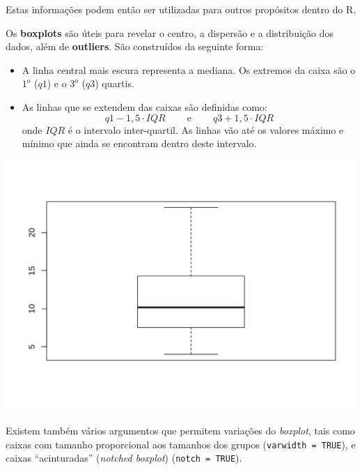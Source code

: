 \documentclass[10pt,a4paper]{book}
\newenvironment{Shaded}{\begin{snugshade}}{\end{snugshade}}
\newcommand{\KeywordTok}[1]{\textcolor[rgb]{0.13,0.29,0.53}{\textbf{#1}}}
\newcommand{\OperatorTok}[1]{\textcolor[rgb]{0.81,0.36,0.00}{\textbf{#1}}}
\newcommand{\NormalTok}[1]{#1}
\providecommand{\tightlist}{%
  \setlength{\itemsep}{0pt}\setlength{\parskip}{0pt}}
\begin{document}
Estas informações podem então ser utilizadas para outros propósitos
dentro do R.

Os \textbf{boxplots} são úteis para revelar o centro, a dispersão e a
distribuição dos dados, além de \textbf{outliers}. São construídos da
seguinte forma:

\begin{itemize}
\tightlist
\item
  A linha central mais escura representa a mediana. Os extremos da caixa
  são o \(1^{o}\) (\(q1\)) e o \(3^{o}\) (\(q3\)) quartis.
\item
  As linhas que se extendem das caixas são definidas como:
  \[q1-1,5\cdot IQR\ \qquad \mathrm{e}\ \qquad q3+1,5\cdot IQR\] onde
  \(IQR\) é o intervalo inter-quartil. As linhas vão até os valores
  máximo e mínimo que ainda se encontram dentro deste intervalo.
\end{itemize}

\begin{Shaded}
\end{Shaded}

\begin{center}\includegraphics{figures/unnamed-chunk-312-1} \end{center}

Existem também vários argumentos que permitem variações do
\emph{boxplot}, tais como caixas com tamanho proporcional aos tamanhos
dos grupos (\texttt{varwidth\ =\ TRUE}), e caixas ``acinturadas''
(\emph{notched boxplot}) (\texttt{notch\ =\ TRUE}).
\end{document}
